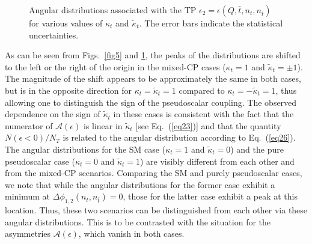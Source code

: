 \documentclass[aps,preprint,tightenlines,floatfix,superscriptaddress,nofootinbib,showpacs]{revtex4-1}
\def\tbar{\bar{t}}
\def\kp{\kappa_t}
\def\kpt{\tilde{\kappa}_t}
\def\TPb{\epsilon(Q,\tbar,n_t,n_{\tbar})}
\begin{document}
\begin{center}
\begin{figure}[H]
\hspace*{0.002\textwidth}
\caption{Angular distributions associated with the TP $\epsilon_2 = \TPb$ for
  various values of $\kp$ and $\kpt$. The error bars indicate the statistical
  uncertainties.}
\label{fig6}
\end{figure}
\end{center}
\par As can be seen from Figs.~\ref{fig5} and \ref{fig6}, the
peaks of the 
distributions are shifted to the left or the right of the origin
in the mixed-$\mathrm{CP}$
cases ($\kp =1$ and $\kpt=\pm 1$).
The magnitude of the shift appears to be approximately the
same in both cases, but is in the
opposite direction for $\kp=\kpt=1$ compared to $\kp=-\kpt=1$, thus allowing
one to distinguish
the sign of the pseudoscalar coupling. The observed dependence
on the sign of $\kpt$ in these cases
is consistent with the fact that the numerator of $\mathcal{A}(\epsilon)$
is linear in $\kpt$ [see Eq.~(\ref{eq23})]
and that the quantity $N(\epsilon < 0)/N_T$ is related
to the angular distribution according to Eq.~(\ref{eq26}). The angular
distributions for the SM case ($\kp =1$ and $\kpt=0$) and
the pure pseudoscalar case ($\kp =0$ and $\kpt= 1$) are
visibly different from each other and from the mixed-$\mathrm{CP}$
scenarios. Comparing the SM and purely pseudoscalar cases,
we note that while the angular distributions for the former case
exhibit a minimum at $\Delta\phi_{1,2}(n_t,n_{\tbar})=0$, those
for the latter case exhibit a peak at this location.
Thus, these two scenarios can be distinguished from each other
via these angular distributions.  This is to be contrasted
with the situation for the asymmetries $\mathcal{A}(\epsilon)$, which vanish
in both cases.
\end{document}
